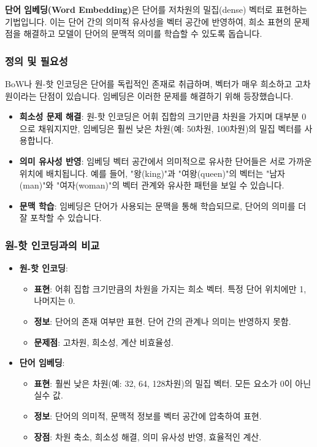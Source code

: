 \documentclass[11pt,a4paper]{article}
\theoremstyle{definition}
\begin{document}
\begin{tcolorbox}[conceptbox, title=\textbf{핵심 개념}]
\textbf{단어 임베딩(Word Embedding)}은 단어를 저차원의 밀집(dense) 벡터로 표현하는 기법입니다. 이는 단어 간의 의미적 유사성을 벡터 공간에 반영하여, 희소 표현의 문제점을 해결하고 모델이 단어의 문맥적 의미를 학습할 수 있도록 돕습니다.
\end{tcolorbox}

\subsubsection{정의 및 필요성}
BoW나 원-핫 인코딩은 단어를 독립적인 존재로 취급하며, 벡터가 매우 희소하고 고차원이라는 단점이 있습니다. 임베딩은 이러한 문제를 해결하기 위해 등장했습니다.

\begin{itemize}
    \item \textbf{희소성 문제 해결}: 원-핫 인코딩은 어휘 집합의 크기만큼 차원을 가지며 대부분 0으로 채워지지만, 임베딩은 훨씬 낮은 차원(예: 50차원, 100차원)의 밀집 벡터를 사용합니다.
    \item \textbf{의미 유사성 반영}: 임베딩 벡터 공간에서 의미적으로 유사한 단어들은 서로 가까운 위치에 배치됩니다. 예를 들어, "왕(king)"과 "여왕(queen)"의 벡터는 "남자(man)"와 "여자(woman)"의 벡터 관계와 유사한 패턴을 보일 수 있습니다.
    \item \textbf{문맥 학습}: 임베딩은 단어가 사용되는 문맥을 통해 학습되므로, 단어의 의미를 더 잘 포착할 수 있습니다.
\end{itemize}

\subsubsection{원-핫 인코딩과의 비교}
\begin{itemize}
    \item \textbf{원-핫 인코딩}:
        \begin{itemize}
            \item \textbf{표현}: 어휘 집합 크기만큼의 차원을 가지는 희소 벡터. 특정 단어 위치에만 1, 나머지는 0.
            \item \textbf{정보}: 단어의 존재 여부만 표현. 단어 간의 관계나 의미는 반영하지 못함.
            \item \textbf{문제점}: 고차원, 희소성, 계산 비효율성.
        \end{itemize}
    \item \textbf{단어 임베딩}:
        \begin{itemize}
            \item \textbf{표현}: 훨씬 낮은 차원(예: 32, 64, 128차원)의 밀집 벡터. 모든 요소가 0이 아닌 실수 값.
            \item \textbf{정보}: 단어의 의미적, 문맥적 정보를 벡터 공간에 압축하여 표현.
            \item \textbf{장점}: 차원 축소, 희소성 해결, 의미 유사성 반영, 효율적인 계산.
        \end{itemize}
\end{itemize}
\end{document}
